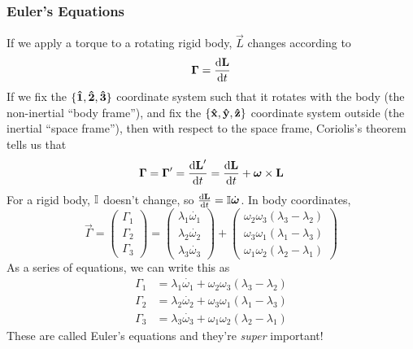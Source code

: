 \documentclass[a4paper]{article}
\begin{document}
\subsubsection{Euler's Equations}
If we apply a torque to a rotating rigid body, $\vec{L}$ changes according to
\[ \boldsymbol{\mathbf{\Gamma}} = \frac{\mathrm{d} \boldsymbol{\mathbf{L}}}{\mathrm{d} t} \]
If we fix the $\{\boldsymbol{\mathbf{\hat{1}}},\boldsymbol{\mathbf{\hat{2}}},\boldsymbol{\mathbf{\hat{3}}}\}$ coordinate system such that it
rotates with the body (the non-inertial ``body frame''), and fix the
$\{\boldsymbol{\mathbf{\hat{x}}},\boldsymbol{\mathbf{\hat{y}}},\boldsymbol{\mathbf{\hat{z}}}\}$ coordinate system outside (the inertial ``space frame''), then
with respect to the space frame, Coriolis's theorem tells us that
\[ \boldsymbol{\mathbf{\Gamma}} = \boldsymbol{\mathbf{\Gamma}}' = \frac{\mathrm{d} \boldsymbol{\mathbf{L}}'}{\mathrm{d} t} = \frac{\mathrm{d} \boldsymbol{\mathbf{L}}}{\mathrm{d} t}
+ \boldsymbol{\mathbf{\omega}}\times\boldsymbol{\mathbf{L}} \]
For a rigid body, $\mathbb{I}$ doesn't change, so
$\frac{\mathrm{d} \boldsymbol{\mathbf{L}}}{\mathrm{d} t}=\mathbb{I}\dot{\boldsymbol{\mathbf{\omega}}}$. In body coordinates,
\[
	\vec{\Gamma} =
	\begin{pmatrix}
		\Gamma_1\\\Gamma_2\\\Gamma_3
	\end{pmatrix} = 
	\begin{pmatrix}
		\lambda_1\dot{\omega_1}\\
		\lambda_2\dot{\omega_2}\\
		\lambda_3\dot{\omega_3}
	\end{pmatrix} + 
	\begin{pmatrix}
		\omega_2\omega_3(\lambda_3-\lambda_2)\\
		\omega_3\omega_1(\lambda_1-\lambda_3)\\
		\omega_1\omega_2(\lambda_2-\lambda_1)
	\end{pmatrix}
\]
As a series of equations, we can write this as
\begin{align*}
	\Gamma_1 &= \lambda_1\dot{\omega_1}+
		\omega_2\omega_3(\lambda_3-\lambda_2)\\
	\Gamma_2 &= \lambda_2\dot{\omega_2}+
		\omega_3\omega_1(\lambda_1-\lambda_3)\\
	\Gamma_3 &= \lambda_3\dot{\omega_3}+
		\omega_1\omega_2(\lambda_2-\lambda_1)
\end{align*}
These are called Euler's equations and they're \emph{super} important!
\end{document}
